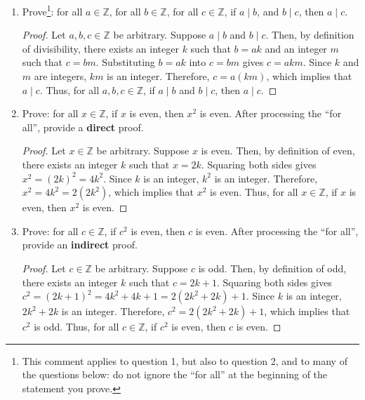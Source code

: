 \documentclass{article}
\begin{document}
\begin{enumerate}
            \newpage

      \item Prove\footnote{This comment applies to question 1, but also to question 2, and
                  to many of the questions below: do not ignore the ``for all'' at the beginning
                  of the statement you prove.}: for all $a \in \mathbb{Z}$, for all $b \in
                  \mathbb{Z}$, for all $c \in \mathbb{Z}$, if $a \mid b$, and $b \mid c$, then $a
                  \mid c$.

            \begin{proof}
                  Let $a, b, c \in \mathbb{Z}$ be arbitrary. Suppose $a \mid b$ and $b \mid c$. Then, by definition of divisibility, there exists an integer $k$ such that $b = ak$ and an integer $m$ such that $c = bm$. Substituting $b = ak$ into $c = bm$ gives $c = akm$. Since $k$ and $m$ are integers, $km$ is an integer. Therefore, $c = a(km)$, which implies that $a \mid c$. Thus, for all $a, b, c \in \mathbb{Z}$, if $a \mid b$ and $b \mid c$, then $a \mid c$.
            \end{proof}

            \newpage

      \item Prove: for all $x \in \mathbb{Z}$, if $x$ is even, then $x^2$ is even. After
            processing the ``for all'', provide a {\bf direct} proof.

            \begin{proof}
                  Let $x \in \mathbb{Z}$ be arbitrary. Suppose $x$ is even. Then, by definition of even, there exists an integer $k$ such that $x = 2k$. Squaring both sides gives $x^2 = (2k)^2 = 4k^2$. Since $k$ is an integer, $k^2$ is an integer. Therefore, $x^2 = 4k^2 = 2(2k^2)$, which implies that $x^2$ is even. Thus, for all $x \in \mathbb{Z}$, if $x$ is even, then $x^2$ is even.
            \end{proof}

            \newpage

      \item Prove: for all $c \in \mathbb{Z}$, if $c^2$ is even, then $c$ is even. After
            processing the ``for all'', provide an {\bf indirect} proof.

            \begin{proof}
                  Let $c \in \mathbb{Z}$ be arbitrary. Suppose $c$ is odd. Then, by definition of odd, there exists an integer $k$ such that $c = 2k + 1$. Squaring both sides gives $c^2 = (2k + 1)^2 = 4k^2 + 4k + 1 = 2(2k^2 + 2k) + 1$. Since $k$ is an integer, $2k^2 + 2k$ is an integer. Therefore, $c^2 = 2(2k^2 + 2k) + 1$, which implies that $c^2$ is odd. Thus, for all $c \in \mathbb{Z}$, if $c^2$ is even, then $c$ is even.
            \end{proof}


\end{enumerate}
\end{document}
